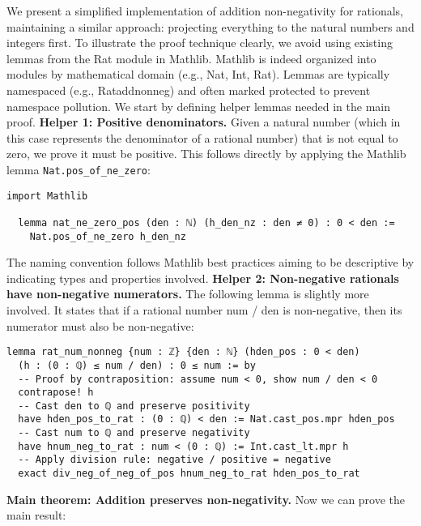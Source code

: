 \begin{example}
We present a simplified implementation of addition non-negativity for rationals, 
maintaining a similar approach: projecting everything to the natural numbers and 
integers first. To illustrate the proof technique clearly, we avoid using existing lemmas 
from the Rat module in Mathlib.
Mathlib is indeed organized into modules by mathematical 
domain (e.g., Nat, Int, Rat). Lemmas are typically namespaced (e.g., Rataddnonneg) 
and often marked protected to prevent namespace pollution. 
We start by defining helper lemmas needed in the main proof.
\textbf{Helper 1: Positive denominators.} Given a natural number 
(which in this case represents the denominator of a rational number) that is not 
equal to zero, we prove it must be positive. This follows directly by 
applying the Mathlib lemma \lstinline[language=lean]|Nat.pos_of_ne_zero|:
\begin{lstlisting}[language=lean]
  import Mathlib

  lemma nat_ne_zero_pos (den : ℕ) (h_den_nz : den ≠ 0) : 0 < den :=
    Nat.pos_of_ne_zero h_den_nz
\end{lstlisting}
The naming convention follows Mathlib best practices aiming to be descriptive by indicating 
types and properties involved.
\textbf{Helper 2: Non-negative rationals have non-negative numerators.} 
The following lemma is slightly more involved. It states that if a rational number num / den 
is non-negative, then its numerator must also be non-negative:
\begin{lstlisting}[language=lean]
  lemma rat_num_nonneg {num : ℤ} {den : ℕ} (hden_pos : 0 < den)
  (h : (0 : ℚ) ≤ num / den) : 0 ≤ num := by
  -- Proof by contraposition: assume num < 0, show num / den < 0
  contrapose! h
  -- Cast den to ℚ and preserve positivity
  have hden_pos_to_rat : (0 : ℚ) < den := Nat.cast_pos.mpr hden_pos
  -- Cast num to ℚ and preserve negativity
  have hnum_neg_to_rat : num < (0 : ℚ) := Int.cast_lt.mpr h
  -- Apply division rule: negative / positive = negative
  exact div_neg_of_neg_of_pos hnum_neg_to_rat hden_pos_to_rat
\end{lstlisting}

\textbf{Main theorem: Addition preserves non-negativity.} Now we can prove the main result:


\end{example}
